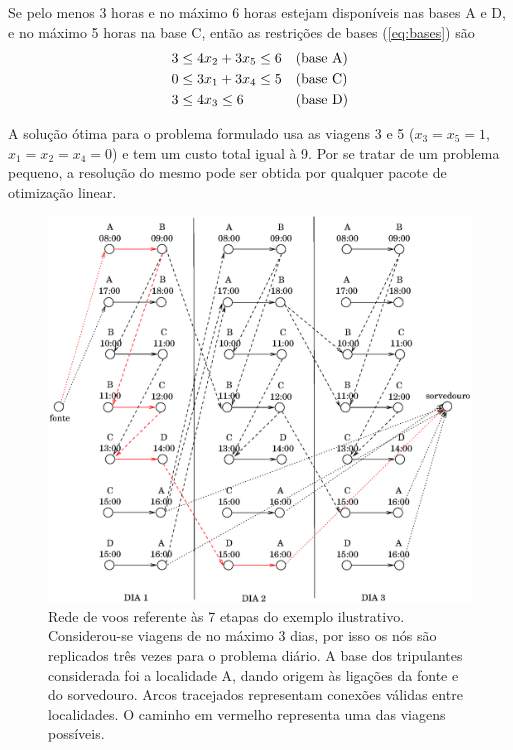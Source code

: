Se pelo menos 3 horas e no máximo 6 horas estejam disponíveis nas bases A e D, e no máximo 5 horas 
na base C, então as restrições de bases (\ref{eq:bases}) são
%
\begin{equation*}
	\begin{array}{ll}
		3 \leq 4 x_2 + 3 x_5 \leq 6 & \text{(base A)} \vsp \\
		0 \leq 3 x_1 + 3 x_4 \leq 5 & \text{(base C)} \vsp \\
		3 \leq 4 x_3 \leq 6 & \text{(base D)}
	\end{array}
\end{equation*}

A solução ótima para o problema formulado usa as viagens 3 e 5 ($x_3 = x_5 = 1$, 
$x_1 = x_2 = x_4 =  0$) e tem um custo total igual à 9. Por se tratar de um problema pequeno, a
resolução do mesmo pode ser obtida por qualquer pacote de otimização linear.

\begin{figure}[htbp]
	\begin{center}
		\includegraphics[scale=0.80]{fig/rede.eps}
		\caption{Rede de voos referente às 7 etapas do exemplo ilustrativo. Considerou-se
		viagens de no máximo 3 dias, por isso os nós são replicados três vezes para o
		problema diário. A base dos tripulantes considerada foi a localidade A, dando origem
		às ligações da fonte e do sorvedouro.
		Arcos tracejados representam conexões válidas entre localidades. O caminho em
		vermelho representa uma das viagens possíveis.}
		\label{fig:rede}
	\end{center}
\end{figure}

